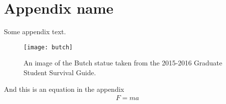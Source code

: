 \chapter{Appendix name}

Some appendix text.
\begin{figure}[H] %
    \centering
    \texttt{[image: butch]}
    \caption{An image of the Butch statue taken from the 2015-2016 Graduate Student Survival Guide.}
    \label{fig:a1}
\end{figure}
And this is an equation in the appendix
\begin{align}
    F=ma
\end{align} 